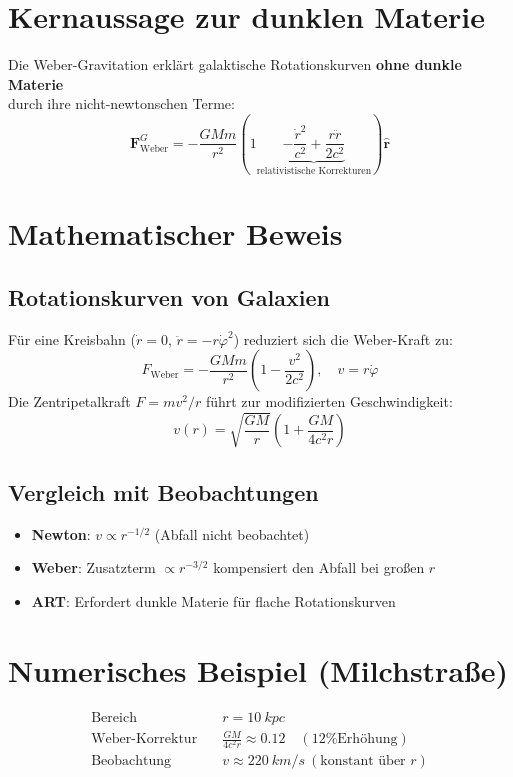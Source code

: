 \section{Kernaussage zur dunklen Materie}
Die Weber-Gravitation erklärt galaktische Rotationskurven \textbf{ohne dunkle Materie}\\durch ihre nicht-newtonschen Terme:
\begin{equation}
\mathbf{F}_{\text{Weber}}^G = -\frac{GMm}{r^2}\left(1 \underbrace{-\frac{\dot{r}^2}{c^2} + \frac{r\ddot{r}}{2c^2}}_{\text{relativistische Korrekturen}}\right)\mathbf{\hat{r}}
\end{equation}

\section*{Mathematischer Beweis}

\subsection*{Rotationskurven von Galaxien}
Für eine Kreisbahn (\(\dot{r}=0\), \(\ddot{r} = -r\dot{\varphi}^2\)) reduziert sich die Weber-Kraft zu:
\begin{equation}
F_{\text{Weber}} = -\frac{GMm}{r^2}\left(1 - \frac{v^2}{2c^2}\right), \quad v = r\dot{\varphi}
\end{equation}
Die Zentripetalkraft \(F = mv^2/r\) führt zur modifizierten Geschwindigkeit:
\begin{equation}
v(r) = \sqrt{\frac{GM}{r}} \left(1 + \frac{GM}{4c^2r}\right)
\end{equation}

\subsection*{Vergleich mit Beobachtungen}
\begin{itemize}
\item \textbf{Newton}: \(v \propto r^{-1/2}\) (Abfall nicht beobachtet)
\item \textbf{Weber}: Zusatzterm \(\propto r^{-3/2}\) kompensiert den Abfall bei großen \(r\)
\item \textbf{ART}: Erfordert dunkle Materie für flache Rotationskurven \cite{rubin1970}
\end{itemize}

\section*{Numerisches Beispiel (Milchstraße)}
\begin{align*}
\text{Bereich} &\quad r = \SI{10}{kpc} \\
\text{Weber-Korrektur} &\quad \frac{GM}{4c^2r} \approx 0.12 \quad (\text{12\% Erhöhung}) \\
\text{Beobachtung} &\quad v \approx \SI{220}{km/s} \ (\text{konstant über } r)
\end{align*}

